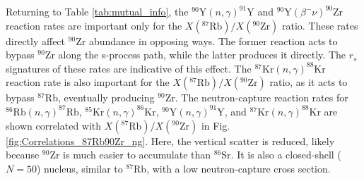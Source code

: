 Returning to Table \ref{tab:mutual_info}, the $^{90}\mathrm{Y}(n,\gamma)^{91}\mathrm{Y}$ and $^{90}\mathrm{Y}(\beta^{-}\nu)^{90}\mathrm{Zr}$ reaction rates are important only for the $X(^{87}\mathrm{Rb})/X(^{90}\mathrm{Zr})$ ratio. These rates directly affect $^{90}$Zr abundance in opposing ways. The former reaction acts to bypass $^{90}$Zr along the s-process path, while the latter produces it directly. The $r_{s}$ signatures of these rates are indicative of this effect. The $^{87}\mathrm{Kr}(n,\gamma)^{88}\mathrm{Kr}$ reaction rate is also important for the $X(^{87}\mathrm{Rb})/X(^{90}\mathrm{Zr})$ ratio, as it acts to bypass $^{87}$Rb, eventually producing $^{90}$Zr. The neutron-capture reaction rates for $^{86}\mathrm{Rb}(n,\gamma)^{87}\mathrm{Rb}$, $^{85}\mathrm{Kr}(n,\gamma)^{86}\mathrm{Kr}$, $^{90}\mathrm{Y}(n,\gamma)^{91}\mathrm{Y}$, and $^{87}\mathrm{Kr}(n,\gamma)^{88}\mathrm{Kr}$ are shown correlated with $X(^{87}\mathrm{Rb})/X(^{90}\mathrm{Zr})$ in Fig. \ref{fig:Correlations_87Rb90Zr_ng}. Here, the vertical scatter is reduced, likely because $^{90}$Zr is much easier to accumulate than $^{86}$Sr. It is also a closed-shell ($N=50$) nucleus, similar to $^{87}$Rb, with a low neutron-capture cross section.

